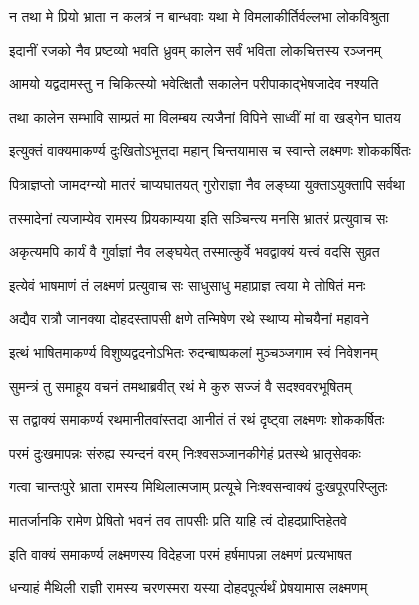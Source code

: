 \twolineshloka
{न तथा मे प्रियो भ्राता न कलत्रं न बान्धवाः}
{यथा मे विमलाकीर्तिर्वल्लभा लोकविश्रुता}%

\twolineshloka
{इदानीं रजको नैव प्रष्टव्यो भवति ध्रुवम्}
{कालेन सर्वं भविता लोकचित्तस्य रञ्जनम्}%

\twolineshloka
{आमयो यद्वदामस्तु न चिकित्स्यो भवेत्क्षितौ}
{सकालेन परीपाकाद्भेषजादेव नश्यति}%

\twolineshloka
{तथा कालेन सम्भावि साम्प्रतं मा विलम्बय}
{त्यजैनां विपिने साध्वीं मां वा खड्गेन घातय}%

\twolineshloka
{इत्युक्तं वाक्यमाकर्ण्य दुःखितोऽभूत्तदा महान्}
{चिन्तयामास च स्वान्ते लक्ष्मणः शोककर्षितः}%

\twolineshloka
{पित्राज्ञप्तो जामदग्न्यो मातरं चाप्यघातयत्}
{गुरोराज्ञा नैव लङ्घ्या युक्ताऽयुक्तापि सर्वथा}%

\twolineshloka
{तस्मादेनां त्यजाम्येव रामस्य प्रियकाम्यया}
{इति सञ्चिन्त्य मनसि भ्रातरं प्रत्युवाच सः}%


\twolineshloka
{अकृत्यमपि कार्यं वै गुर्वाज्ञां नैव लङ्घयेत्}
{तस्मात्कुर्वे भवद्वाक्यं यत्त्वं वदसि सुव्रत}%

\twolineshloka
{इत्येवं भाषमाणं तं लक्ष्मणं प्रत्युवाच सः}
{साधुसाधु महाप्राज्ञ त्वया मे तोषितं मनः}%

\twolineshloka
{अद्यैव रात्रौ जानक्या दोहदस्तापसी क्षणे}
{तन्मिषेण रथे स्थाप्य मोचयैनां महावने}%

\twolineshloka
{इत्थं भाषितमाकर्ण्य विशुष्यद्वदनोऽभितः}
{रुदन्बाष्पकलां मुञ्चञ्जगाम स्वं निवेशनम्}%

\twolineshloka
{सुमन्त्रं तु समाहूय वचनं तमथाब्रवीत्}
{रथं मे कुरु सज्जं वै सदश्ववरभूषितम्}%

\twolineshloka
{स तद्वाक्यं समाकर्ण्य रथमानीतवांस्तदा}
{आनीतं तं रथं दृष्ट्वा लक्ष्मणः शोककर्षितः}%

\twolineshloka
{परमं दुःखमापन्नः संरुह्य स्यन्दनं वरम्}
{निःश्वसञ्जानकीगेहं प्रतस्थे भ्रातृसेवकः}%

\twolineshloka
{गत्वा चान्तःपुरे भ्राता रामस्य मिथिलात्मजाम्}
{प्रत्यूचे निःश्वसन्वाक्यं दुःखपूरपरिप्लुतः}%

\twolineshloka
{मातर्जानकि रामेण प्रेषितो भवनं तव}
{तापसीः प्रति याहि त्वं दोहदप्राप्तिहेतवे}%

\twolineshloka
{इति वाक्यं समाकर्ण्य लक्ष्मणस्य विदेहजा}
{परमं हर्षमापन्ना लक्ष्मणं प्रत्यभाषत}%


\twolineshloka
{धन्याहं मैथिली राज्ञी रामस्य चरणस्मरा}
{यस्या दोहदपूर्त्यर्थं प्रेषयामास लक्ष्मणम्}%


